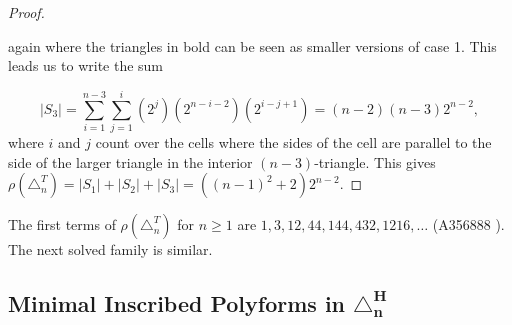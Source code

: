 \documentclass[12pt]{article}
\theoremstyle{plain}
\theoremstyle{definition}
\theoremstyle{remark}
\theoremstyle{definition}
\begin{document}
\begin{proof}
\begin{center}
\end{center}

\noindent again where the triangles in bold can be seen as smaller versions of case 1. This leads us to write the sum

$$|S_3| = \sum_{i=1}^{n-3}\sum_{j=1}^{i}(2^{j})(2^{n-i-2})(2^{i-j+1}) = (n-2)(n-3)2^{n-2},$$
\noindent where $i$ and $j$ count over the cells where the sides of the cell are parallel to the side of the larger triangle in the interior $(n-3)$-triangle. This gives $\rho(\triangle^T_n) = |S_1| + |S_2| + |S_3| =((n-1)^2 +2)2^{n-2}$.

\end{proof}

\noindent The first terms of $\rho(\triangle^T_n)$ for $n \geq 1$ are $1, 3, 12, 44, 144, 432, 1216, \dots$ (A356888 \cite{oeis}). The next solved family is similar. 

\subsection{Minimal Inscribed Polyforms in \texorpdfstring{$\mathbf{\triangle^{H}_n}$}{Hn} }
\end{document}
